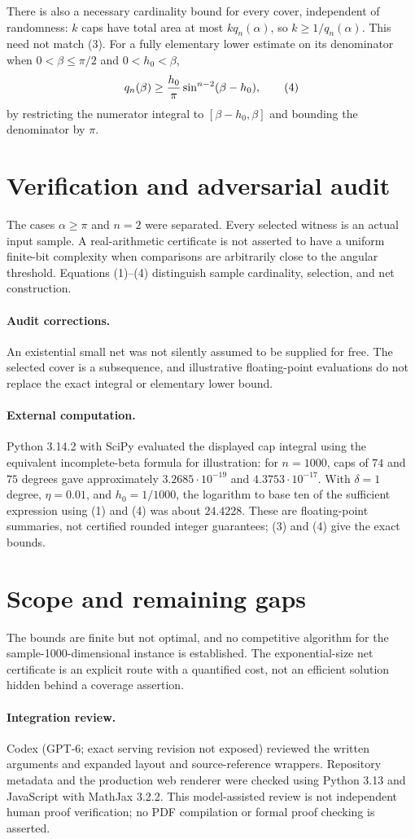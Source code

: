 \documentclass[11pt]{article}
\begin{document}
There is also a necessary cardinality bound for every cover, independent of randomness: $k$ caps have total area at most $k q_n(\alpha)$, so $k\geq1/q_n(\alpha)$. This need not match (3). For a fully elementary lower estimate on its denominator when $0<\beta\leq\pi/2$ and $0<h_0<\beta$,
\[
 q_n(\beta)\geq {h_0\over\pi}\sin^{n-2}(\beta-h_0),        \tag{4}
\]
by restricting the numerator integral to $[\beta-h_0,\beta]$ and bounding the denominator by $\pi$.
\section{Verification and adversarial audit}
The cases $\alpha\geq\pi$ and $n=2$ were separated. Every selected witness is an actual input sample. A real-arithmetic certificate is not asserted to have a uniform finite-bit complexity when comparisons are arbitrarily close to the angular threshold. Equations (1)--(4) distinguish sample cardinality, selection, and net construction.
\paragraph{Audit corrections.} An existential small net was not silently assumed to be supplied for free. The selected cover is a subsequence, and illustrative floating-point evaluations do not replace the exact integral or elementary lower bound.
\paragraph{External computation.} Python 3.14.2 with SciPy evaluated the displayed cap integral using the equivalent incomplete-beta formula for illustration: for $n=1000$, caps of $74$ and $75$ degrees gave approximately $3.2685\cdot10^{-19}$ and $4.3753\cdot10^{-17}$. With $\delta=1$ degree, $\eta=0.01$, and $h_0=1/1000$, the logarithm to base ten of the sufficient expression using (1) and (4) was about $24.4228$. These are floating-point summaries, not certified rounded integer guarantees; (3) and (4) give the exact bounds.
\section{Scope and remaining gaps}
The bounds are finite but not optimal, and no competitive algorithm for the sample-1000-dimensional instance is established. The exponential-size net certificate is an explicit route with a quantified cost, not an efficient solution hidden behind a coverage assertion.
\paragraph{Integration review.} Codex (GPT-6; exact serving revision not exposed) reviewed the written arguments and expanded layout and source-reference wrappers. Repository metadata and the production web renderer were checked using Python 3.13 and JavaScript with MathJax 3.2.2. This model-assisted review is not independent human proof verification; no PDF compilation or formal proof checking is asserted.
\end{document}
